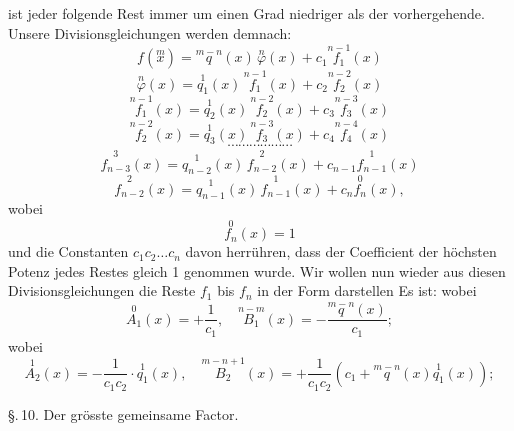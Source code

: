 ist jeder folgende Rest immer um einen Grad niedriger als der vorhergehende.
Unsere Divisionsgleichungen werden demnach:
\[ f(\overset{m}{x}) = \overset{m-n}{q}(x)\, \overset{n}{\varphi}(x) + c_1 \overset{n-1}{f_1}(x) \]
\[ \overset{n}{\varphi}(x) = \overset{1}{q_1}(x)\, \overset{n-1}{f_1}(x) + c_2 \overset{n-2}{f_2}(x) \]
\[ \overset{n-1}{f_1}(x) = \overset{1}{q_2}(x)\, \overset{n-2}{f_2}(x) + c_3 \overset{n-3}{f_3}(x) \]
\[ \overset{n-2}{f_2}(x) = \overset{1}{q_3}(x)\, \overset{n-3}{f_3}(x) + c_4 \overset{n-4}{f_4}(x) \]
\[ \cdots\cdots\cdots\cdots\cdots\cdots \]
\[ \overset{3}{f_{n-3}}(x) = \overset{1}{q_{n-2}}(x)\, \overset{2}{f_{n-2}}(x) + c_{n-1} \overset{1}{f_{n-1}}(x) \]
\[ \overset{2}{f_{n-2}}(x) = \overset{1}{q_{n-1}}(x)\, \overset{1}{f_{n-1}}(x) + c_n \overset{0}{f_n}(x), \]
wobei
\[ \overset{0}{f_n}(x) = 1 \]
und die Constanten $c_1 c_2 \ldots c_n$ davon herrühren, dass der Coefficient der höchsten Potenz jedes Restes gleich 1 genommen wurde. Wir wollen nun wieder aus diesen Divisionsgleichungen die Reste $f_1$ bis $f_n$ in der Form darstellen
Es ist:
wobei
\[ \overset{0}{A_1}(x) = +\frac{1}{c_1}, \quad \overset{n-m}{B_1}(x) = -\frac{\overset{m-n}{q}(x)}{c_1}; \]
wobei
\[ \overset{1}{A_2}(x) = -\frac{1}{c_1c_2}\cdot \overset{1}{q_1}(x), \quad \overset{m-n+1}{B_2}(x) = +\frac{1}{c_1c_2}\left( c_1 + \overset{m-n}{q}(x)\overset{1}{q_1}(x) \right); \]


\S.\,10. Der grösste gemeinsame Factor.

